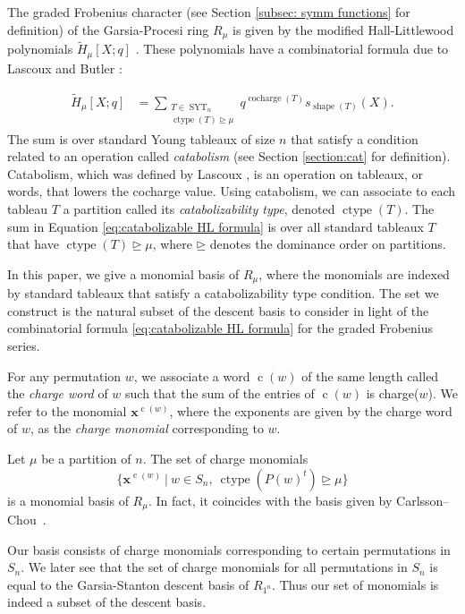 \documentclass[ALCO, Unicode]{cedram}
\DeclareMathOperator{\cocharge}{cocharge}
\DeclareMathOperator{\syt}{SYT}
\DeclareMathOperator{\ctype}{ctype}
\DeclareMathOperator{\shape}{shape}
\DeclareMathOperator{\cw}{c}
\newcommand{\mHL}{\tilde{H}}
\begin{document}
The graded Frobenius character (see Section \ref{subsec: symm functions} for definition) of the Garsia-Procesi ring $R_\mu$ is given by the modified Hall-Littlewood polynomials 
$\tilde{H}_\mu[X;q]$ \cite{HottaSpringer}. These polynomials have a combinatorial formula due to  
Lascoux \cite{Lascoux} and Butler \cite{butler}:

\begin{align}\label{eq:catabolizable HL formula}
        \mHL_\mu[X;q] &=  \sum\limits_{\substack{T\in \syt_n\\  \ctype(T)\unrhd\mu}}  q^{\cocharge(T)} s_{\shape(T)}(X).
\end{align}
The sum is over standard Young tableaux of size $n$ that satisfy a condition related to an operation called \textit{catabolism} (see Section \ref{section:cat} for definition). Catabolism, which was defined by Lascoux \cite{Lascoux},  is an operation on tableaux, or words, that lowers the cocharge value. 
Using catabolism, we can associate to each tableau $T$ a partition called its \textit{catabolizability type}, denoted $\ctype(T)$.
The sum in Equation \eqref{eq:catabolizable HL formula} is over all standard tableaux $T$ that have $\ctype(T) \unrhd \mu$, where $\unrhd$ denotes the dominance order on partitions.


In this paper, we give a monomial basis of $R_{\mu}$, where the monomials are indexed by standard tableaux that satisfy a catabolizability type condition. 
The set we construct is the natural subset of the descent basis to consider in light of the combinatorial formula \eqref{eq:catabolizable HL formula} for the graded Frobenius series.


For any permutation $w$, we associate a word $\cw(w)$ of the same length called the \textit{charge word} of $w$ such that the sum of the entries of $\cw(w)$ is charge($w$).
We refer to the monomial $\mathbf{x}^{\cw(w)}$, where the exponents are given by the charge word of $w$, as the \textit{charge monomial} corresponding to $w$.


\begin{thm1}
\makeatletter{}\makeatother
 Let $\mu$ be a partition of $n$.
     The set of charge monomials 
     \[ \{\mathbf{x}^{\cw(w)}\ | \ w\in S_n, \ \ctype(P(w)^t)\unrhd\mu\}\]
    is a monomial basis of $R_{\mu}$.
    In fact, it coincides with the basis given by Carlsson--Chou~\cite{CC}.
\end{thm1}

Our basis consists of charge monomials corresponding to certain permutations in $S_n$. We later see that the set of charge monomials for all permutations in $S_n$ is equal to the Garsia-Stanton descent basis of $R_{1^n}$. Thus our set of monomials is indeed a subset of the descent basis.  
\end{document}

